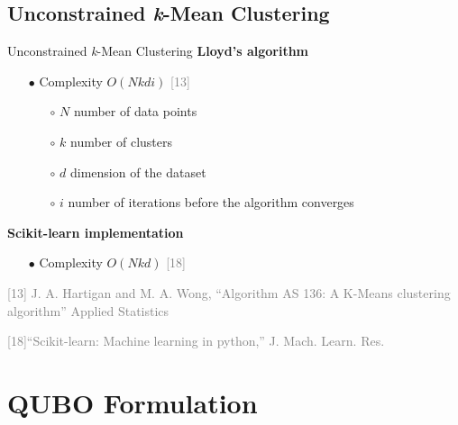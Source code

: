 \subsection{Unconstrained \textit{k}-Mean Clustering}
	\begin{frame}{Unconstrained \textit{k}-Mean Clustering}
		\textbf{Lloyd’s algorithm}
		\begin{itemize}
			\item[$\bullet$] Complexity $O(Nkdi)$ \textcolor{gray}{[13]}
			\begin{itemize}
				\item[$\circ$] $N$ number of data points
				\item[$\circ$] $k$ number of clusters 
				\item[$\circ$] $d$ dimension of the dataset
				\item[$\circ$] $i$ number of iterations before the algorithm converges
			\end{itemize} 
		\end{itemize}
		\textbf{Scikit-learn implementation}
		\begin{itemize}
			\item[$\bullet$] Complexity $O(Nkd)$ \textcolor{gray}{[18]}
		\end{itemize}
		\tiny{ %
			\textcolor{gray}{
				\begin{minipage}{0.5\textwidth} %
					[13] J. A. Hartigan and M. A. Wong, “Algorithm AS 136: A K-Means clustering algorithm” Applied Statistics
				\end{minipage}\hfill
				\begin{minipage}{0.5\textwidth} 
					[18]“Scikit-learn: Machine learning in python,” J. Mach. Learn. Res.
				\end{minipage}\hfill
			}
		}
	\end{frame}
	


	


\section{QUBO Formulation}